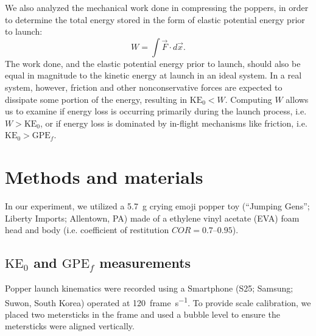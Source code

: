\documentclass[reprint,amsmath,amssymb,aps,twoside]{revtex4-2} %
\begin{document}
We also analyzed the mechanical work done in compressing the poppers, in order to determine the total energy stored in the form of elastic potential energy prior to launch:
\begin{equation}
W = \int \vec{F} \cdot d\vec{x}.
\label{eq:5}
\end{equation} 
The work done, and the elastic potential energy prior to launch, should also be equal in magnitude to the kinetic energy at launch in an ideal system. In a real system, however, friction and other nonconservative forces are expected to dissipate some portion of the energy, resulting in $\text{KE}_0 < W$. Computing $W$ allows us to examine if energy loss is occurring primarily during the launch process, i.e. $W > \text{KE}_0$, or if energy loss is dominated by in-flight mechanisms like friction, i.e. $\text{KE}_0>\text{GPE}_f$. 







\section{Methods and materials}
In our experiment, we utilized a \qty{5.7}{\gram} crying emoji popper toy (``Jumping Gens''; Liberty Imports; Allentown, PA) made of a ethylene vinyl acetate (EVA) foam head and body (i.e. coefficient of restitution $COR = \numrange{0.7}{0.95}$)\cite{simeonov:2016:coefficient}. 

\subsection{$\text{KE}_0$ and $\text{GPE}_f$ measurements}
Popper launch kinematics were recorded using a Smartphone (S25; Samsung; Suwon, South Korea) operated at \qty{120}{frame\per\second}. To provide scale calibration, we placed two metersticks in the frame and used a bubble level to ensure the metersticks were aligned vertically. 
\end{document}
